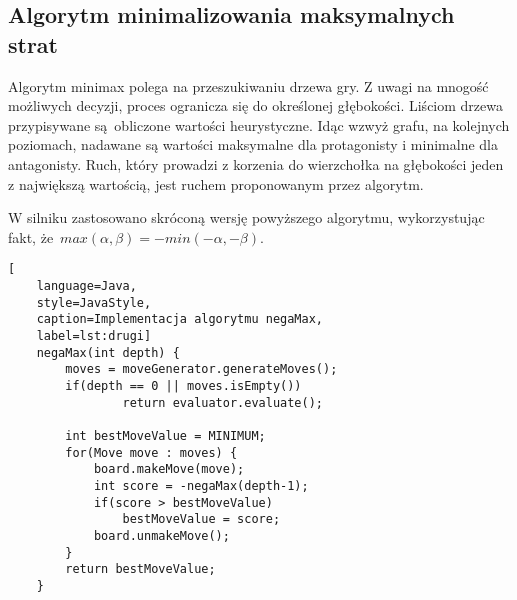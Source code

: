 \subsection{Algorytm minimalizowania maksymalnych strat}
\label{subsec:algorytm-minimalizowania-maksymalnych-strat}

Algorytm minimax polega na przeszukiwaniu drzewa gry.
Z uwagi na mnogość możliwych decyzji, proces ogranicza się do określonej głębokości.
Liściom drzewa przypisywane są~obliczone wartości heurystyczne.
Idąc wzwyż grafu, na kolejnych poziomach, nadawane są wartości maksymalne dla protagonisty i minimalne dla antagonisty.
Ruch, który prowadzi z korzenia do wierzchołka na głębokości jeden z największą wartością, jest ruchem proponowanym przez algorytm.

W silniku zastosowano skróconą wersję powyższego algorytmu, wykorzystując fakt, że~$max(\alpha, \beta) = -min(-\alpha, -\beta)$.

\begin{lstlisting}[
    language=Java,
    style=JavaStyle,
    caption=Implementacja algorytmu negaMax,
    label=lst:drugi]
    negaMax(int depth) {
        moves = moveGenerator.generateMoves();
        if(depth == 0 || moves.isEmpty())
                return evaluator.evaluate();

        int bestMoveValue = MINIMUM;
        for(Move move : moves) {
            board.makeMove(move);
            int score = -negaMax(depth-1);
            if(score > bestMoveValue)
                bestMoveValue = score;
            board.unmakeMove();
        }
        return bestMoveValue;
    }
\end{lstlisting}


